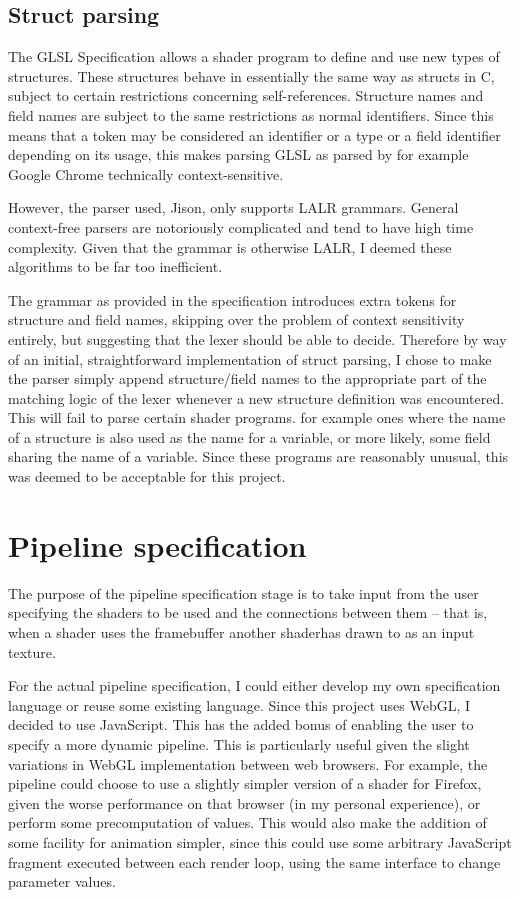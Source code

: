 \documentclass[12pt,twoside,notitlepage]{report}
\begin{document}
\subsection{Struct parsing}
\label{struct-parse}
The GLSL Specification \cite{glsl-spec} allows a shader program to define and use new types of structures. These structures behave in essentially the same way as structs in C, subject to certain restrictions concerning self-references. Structure names and field names are subject to the same restrictions as normal identifiers. Since this means that a token may be considered an identifier or a type or a field identifier depending on its usage, this makes parsing GLSL as parsed by for example Google Chrome technically context-sensitive. 

However, the parser used, Jison, only supports LALR grammars. General context-free parsers are notoriously complicated and tend to have high time complexity. Given that the grammar is otherwise LALR, I deemed these algorithms to be far too inefficient.

The grammar as provided in the specification introduces extra tokens for structure and field names, skipping over the problem of context sensitivity entirely, but suggesting that the lexer should be able to decide. Therefore by way of an initial, straightforward implementation of struct parsing, I chose to make the parser simply append structure/field names to the appropriate part of the matching logic of the lexer whenever a new structure definition was encountered. This will fail to parse certain shader programs. for example ones where the name of a structure is also used as the name for a variable, or more likely, some field sharing the name of a variable. Since these programs are reasonably unusual, this was deemed to be acceptable for this project.

\clearpage
\section{Pipeline specification}
The purpose of the pipeline specification stage is to take input from the user specifying the shaders to be used and the connections between them -- that is, when a shader uses the framebuffer another shaderhas drawn to as an input texture.

For the actual pipeline specification, I could either develop my own specification language or reuse some existing language. Since this project uses WebGL, I decided to use JavaScript. This has the added bonus of enabling the user to specify a more dynamic pipeline. This is particularly useful given the slight variations in WebGL implementation between web browsers. For example, the pipeline could choose to use a slightly simpler version of a shader for Firefox, given the worse performance on that browser (in my personal experience), or perform some precomputation of values. This would also make the addition of some facility for animation simpler, since this could use some arbitrary JavaScript fragment executed between each render loop, using the same interface to change parameter values.
\end{document}
